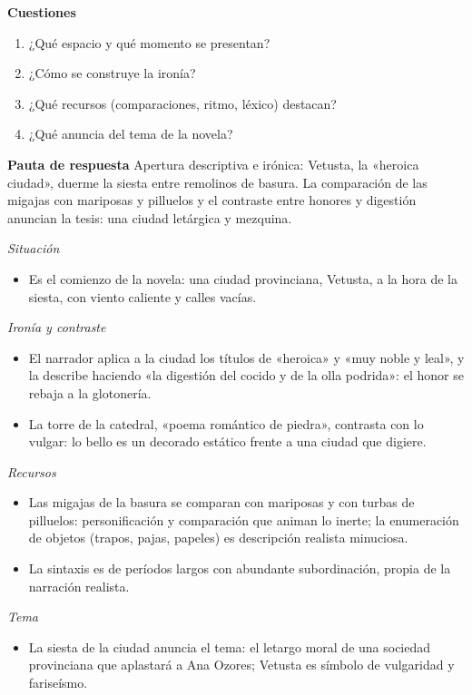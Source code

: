 \documentclass{book}
\begin{document}
\begin{tcolorbox}[title={Ejercicio resuelto}, studiumworked, breakable]
\noindent\textbf{Cuestiones}
\begin{enumerate}
\item ¿Qué espacio y qué momento se presentan?
\item ¿Cómo se construye la ironía?
\item ¿Qué recursos (comparaciones, ritmo, léxico) destacan?
\item ¿Qué anuncia del tema de la novela?
\end{enumerate}

\noindent\textbf{Pauta de respuesta}
Apertura descriptiva e irónica: Vetusta, la «heroica ciudad», duerme la siesta entre remolinos de basura. La comparación de las migajas con mariposas y pilluelos y el contraste entre honores y digestión anuncian la tesis: una ciudad letárgica y mezquina.


\noindent\textit{Situación}
\begin{itemize}
\item Es el comienzo de la novela: una ciudad provinciana, Vetusta, a la hora de la siesta, con viento caliente y calles vacías.
\end{itemize}

\noindent\textit{Ironía y contraste}
\begin{itemize}
\item El narrador aplica a la ciudad los títulos de «heroica» y «muy noble y leal», y la describe haciendo «la digestión del cocido y de la olla podrida»: el honor se rebaja a la glotonería.
\item La torre de la catedral, «poema romántico de piedra», contrasta con lo vulgar: lo bello es un decorado estático frente a una ciudad que digiere.
\end{itemize}

\noindent\textit{Recursos}
\begin{itemize}
\item Las migajas de la basura se comparan con mariposas y con turbas de pilluelos: personificación y comparación que animan lo inerte; la enumeración de objetos (trapos, pajas, papeles) es descripción realista minuciosa.
\item La sintaxis es de períodos largos con abundante subordinación, propia de la narración realista.
\end{itemize}

\noindent\textit{Tema}
\begin{itemize}
\item La siesta de la ciudad anuncia el tema: el letargo moral de una sociedad provinciana que aplastará a Ana Ozores; Vetusta es símbolo de vulgaridad y fariseísmo.
\end{itemize}


\end{tcolorbox}
\end{document}

